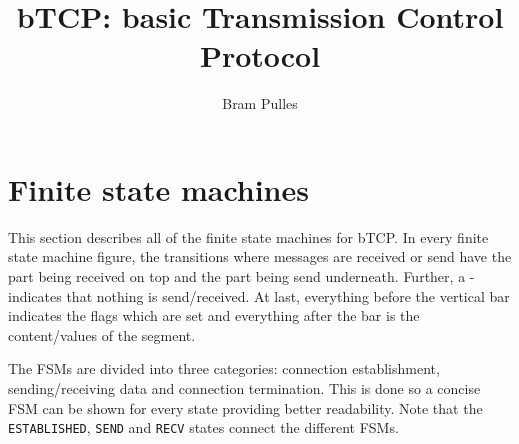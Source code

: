 \documentclass[a4paper]{article}
\author{Bram Pulles}
\title{\textbf{bTCP: basic Transmission Control Protocol}}
\begin{document}
\maketitle

\tableofcontents
\pagebreak

\section{Finite state machines}
This section describes all of the finite state machines for bTCP. In every finite state machine figure, the transitions where messages are received or send have the part being received on top and the part being send underneath. Further, a - indicates that nothing is send/received. At last, everything before the vertical bar indicates the flags which are set and everything after the bar is the content/values of the segment.

The FSMs are divided into three categories: connection establishment, sending/receiving data and connection termination. This is done so a concise FSM can be shown for every state providing better readability. Note that the \texttt{ESTABLISHED}, \texttt{SEND} and \texttt{RECV} states connect the different FSMs.
\end{document}
